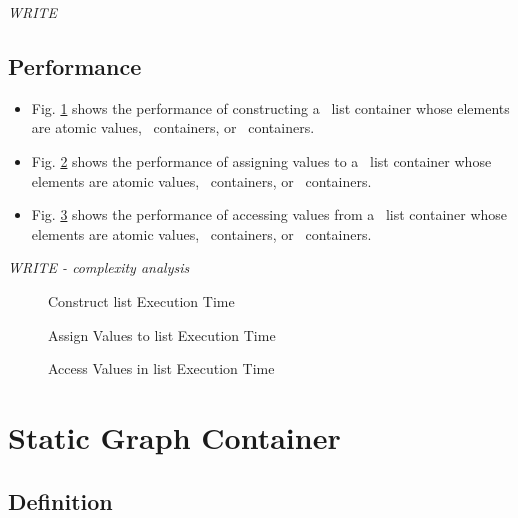 \textit{WRITE}

\subsection{Performance} \label{sec-list-cont-perf}

\begin{itemize}
\item
Fig. \ref{fig:list-cont-constr-exper}
shows the performance of constructing a \stapl\ list container
whose elements are atomic values, \stl\ containers, or \stapl\ containers.
\item
Fig. \ref{fig:list-cont-assign-exper}
shows the performance of assigning values to a \stapl\ list container
whose elements are atomic values, \stl\ containers, or \stapl\ containers.
\item
Fig. \ref{fig:list-cont-access-exper}
shows the performance of accessing values from a \stapl\ list container
whose elements are atomic values, \stl\ containers, or \stapl\ containers.
\end{itemize}

\textit{WRITE - complexity analysis}

\begin{figure}[p]
\caption{Construct list Execution Time}
\label{fig:list-cont-constr-exper}
\end{figure}

\begin{figure}[p]
\caption{Assign Values to list Execution Time}
\label{fig:list-cont-assign-exper}
\end{figure}

\begin{figure}[p]
\caption{Access Values in list Execution Time}
\label{fig:list-cont-access-exper}
\end{figure}



\section{ Static Graph Container} \label{sec-stgraf-cont}

\subsection{Definition}

